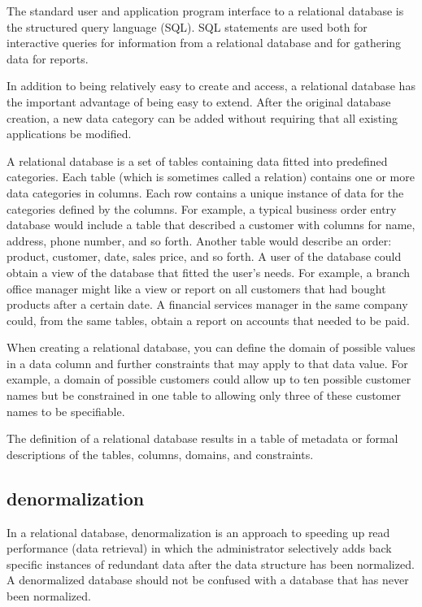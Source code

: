 \documentclass[12pt, a4paper]{report}
\theoremstyle{plain}
\theoremstyle{definition}
\theoremstyle{remark}
\begin{document}
The standard user and application program interface to a relational database is the structured query language (SQL). SQL statements are used both for interactive queries for information from a relational database and for gathering data for reports.

In addition to being relatively easy to create and access, a relational database has the important advantage of being easy to extend. After the original database creation, a new data category can be added without requiring that all existing applications be modified.

A relational database is a set of tables containing data fitted into predefined categories. Each table (which is sometimes called a relation) contains one or more data categories in columns. Each row contains a unique instance of data for the categories defined by the columns. For example, a typical business order entry database would include a table that described a customer with columns for name, address, phone number, and so forth. Another table would describe an order: product, customer, date, sales price, and so forth. A user of the database could obtain a view of the database that fitted the user's needs. For example, a branch office manager might like a view or report on all customers that had bought products after a certain date. A financial services manager in the same company could, from the same tables, obtain a report on accounts that needed to be paid.

When creating a relational database, you can define the domain of possible values in a data column and further constraints that may apply to that data value. For example, a domain of possible customers could allow up to ten possible customer names but be constrained in one table to allowing only three of these customer names to be specifiable.

The definition of a relational database results in a table of metadata or formal descriptions of the tables, columns, domains, and constraints.


\subsection{denormalization}

In a relational database, denormalization is an approach to speeding up read performance (data retrieval) in which the administrator selectively adds back specific instances of redundant data after the data structure has been normalized. A denormalized database should not be confused with a database that has never been normalized.
\end{document}
